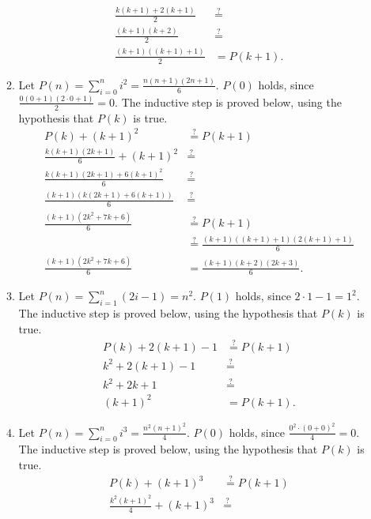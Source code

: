 \documentclass[12pt]{article}
\begin{document}
\begin{enumerate}
\begin{enumerate}
\begin{align*}
            \frac{k (k + 1) + 2(k + 1)}{2} &\stackrel{?}{=} \\
            \frac{(k + 1)(k + 2)}{2} &\stackrel{?}{=} \\
            \frac{(k + 1)((k + 1) + 1)}{2} &= P(k + 1).
        \end{align*}
        \item Let $P(n) = \sum_{i = 0}^{n} i^{2} = \frac{n (n + 1) (2n + 1)}{6}$. $P(0)$ holds, since $\frac{0 (0 + 1) (2 \cdot 0 + 1)}{2} = 0$. The inductive step is proved below, using the hypothesis that $P(k)$ is true.
        \begin{align*}
            P(k) + (k + 1)^{2} &\stackrel{?}{=} P(k + 1) \\
            \frac{k (k + 1) (2k + 1)}{6} + (k + 1)^{2} &\stackrel{?}{=} \\
            \frac{k (k + 1) (2k + 1) + 6(k + 1)^{2}}{6} &\stackrel{?}{=} \\
            \frac{(k + 1)(k(2k + 1) + 6(k + 1))}{6} &\stackrel{?}{=} \\
            \frac{(k + 1)(2k^2 + 7k + 6)}{6} &\stackrel{?}{=} P(k + 1) \\
            &\stackrel{?}{=} \frac{(k + 1)((k + 1) + 1)(2(k + 1) + 1)}{6} \\
            \frac{(k + 1)(2k^2 + 7k + 6)}{6} &= \frac{(k + 1)(k + 2)(2k + 3)}{6}.
        \end{align*}
        \item Let $P(n) = \sum_{i = 1}^{n} (2i - 1) = n^{2}$. $P(1)$ holds, since $2 \cdot 1 - 1 = 1^{2}$. The inductive step is proved below, using the hypothesis that $P(k)$ is true.
        \begin{align*}
            P(k) + 2(k + 1) - 1 &\stackrel{?}{=} P(k + 1) \\
            k^{2} + 2(k + 1) - 1 &\stackrel{?}{=} \\
            k^{2} + 2k + 1 &\stackrel{?}{=} \\
            (k + 1)^{2} &= P(k + 1).
        \end{align*}
        \item Let $P(n) = \sum_{i = 0}^{n} i^{3} = \frac{n^{2} (n + 1)^{2}}{4}$. $P(0)$ holds, since $\frac{0^{2} \cdot (0 + 0)^{2}}{4} = 0$. The inductive step is proved below, using the hypothesis that $P(k)$ is true.
        \begin{align*}
            P(k) + (k + 1)^{3} &\stackrel{?}{=} P(k + 1) \\
            \frac{k^{2} (k + 1)^{2}}{4} + (k + 1)^{3} &\stackrel{?}{=} \\

\end{align*}
\end{enumerate}
\end{enumerate}
\end{document}
